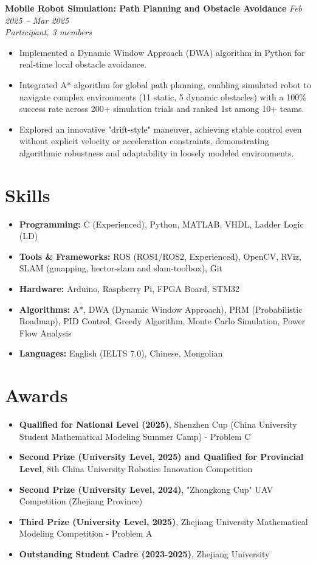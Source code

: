 \documentclass[a4paper,10pt]{article}
\begin{document}
\noindent\textbf{Mobile Robot Simulation: Path Planning and Obstacle Avoidance} \hfill \textit{Feb 2025 -- Mar 2025} \\
\textit{Participant, 3 members} \\
\begin{itemize}
    \item Implemented a Dynamic Window Approach (DWA) algorithm in Python for real-time local obstacle avoidance.
    \item Integrated A* algorithm for global path planning, enabling simulated robot to navigate complex environments (11 static, 5 dynamic obstacles) with a 100\% success rate across 200+ simulation trials and ranked 1st among 10+ teams.
    \item Explored an innovative "drift-style" maneuver, achieving stable control even without explicit velocity or acceleration constraints, demonstrating algorithmic robustness and adaptability in loosely modeled environments.
\end{itemize}

\section*{Skills}
\begin{itemize}
    \item \textbf{Programming:} C (Experienced), Python, MATLAB, VHDL, Ladder Logic (LD)
    \item \textbf{Tools \& Frameworks:} ROS (ROS1/ROS2, Experienced), OpenCV, RViz, SLAM (gmapping, hector-slam and slam-toolbox), Git
    \item \textbf{Hardware:} Arduino, Raspberry Pi, FPGA Board, STM32
    \item \textbf{Algorithms:} A*, DWA (Dynamic Window Approach), PRM (Probabilistic Roadmap), PID Control, Greedy Algorithm, Monte Carlo Simulation, Power Flow Analysis
    \item \textbf{Languages:} English (IELTS 7.0), Chinese, Mongolian
\end{itemize}

\section*{Awards}
\begin{itemize}
    \item \textbf{Qualified for National Level (2025)}, Shenzhen Cup (China University Student Mathematical Modeling Summer Camp) - Problem C
    \item \textbf{Second Prize (University Level, 2025) and Qualified for Provincial Level}, 8th China University Robotics Innovation Competition
    \item \textbf{Second Prize (University Level, 2024)}, "Zhongkong Cup" UAV Competition (Zhejiang Province)
    \item \textbf{Third Prize (University Level, 2025)}, Zhejiang University Mathematical Modeling Competition - Problem A
    \item \textbf{Outstanding Student Cadre (2023-2025)}, Zhejiang University
\end{itemize}
\end{document}
